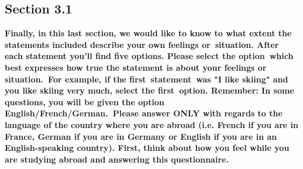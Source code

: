 \documentclass[output=paper]{langsci/langscibook}
\begin{document}
\subsection*{Section 3.1} 

\textbf{Finally, in this last section, we would like to know to what extent the statements included describe your own feelings or~situation. After each statement you’ll find five options. Please select the option~which best expresses how true the statement is about your feelings or situation.~For example, if the first~statement~was "I like skiing" and you like skiing very much, select the first~option. Remember: In some questions, you will be given the option {English}/French/{German}.~Please answer ONLY with regards to the language of the country where you are abroad (i.e. French if you are in France, German if you are in Germany or English if you are in an {English}-speaking country). First, think about how you feel while you are studying abroad and answering this questionnaire.}
\end{document}
